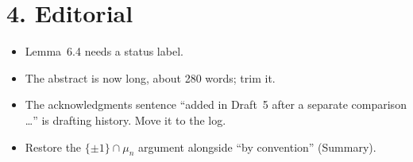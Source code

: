\documentclass[11pt]{article}
\theoremstyle{plain}
\begin{document}
\section*{4. Editorial}
\begin{itemize}
\item Lemma~6.4 needs a status label.
\item The abstract is now long, about 280 words; trim it.
\item The acknowledgments sentence ``added in Draft~5 after a separate
comparison \ldots'' is drafting history. Move it to the log.
\item Restore the $\{\pm1\}\cap\mu_n$ argument alongside ``by
convention'' (Summary).
\end{itemize}
\end{document}
